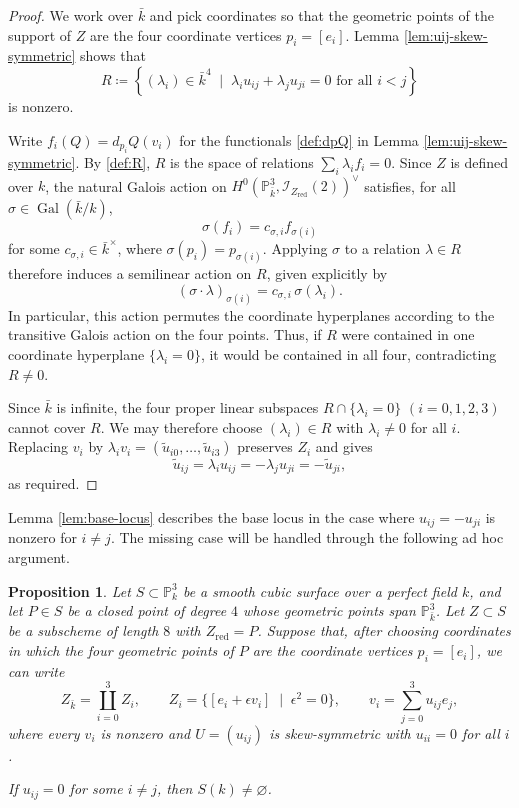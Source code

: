 \documentclass[a4paper,11pt]{amsart}
\numberwithin{equation}{section}
\newtheorem{proposition}[theorem]{Proposition}
\theoremstyle{definition}
\theoremstyle{remark}
\newcommand{\PP}{\mathbb P}
\newcommand{\CP}{\PP}
\newcommand{\Gal}{\operatorname{Gal}}
\begin{document}
\begin{proof}
We work over $\bar k$ and pick coordinates so that the geometric points 
of the support of $Z$ are the four coordinate vertices $p_i=[e_i]$.  
Lemma \ref{lem:uij-skew-symmetric} shows that
\[
R\coloneq \left\{(\lambda_i)\in\bar k^4 \; \mid\; \lambda_i u_{ij}+\lambda_j u_{ji}=0 \text{ for all }i<j\right\}
\]
is nonzero.

Write $f_i(Q)=d_{p_i}Q(v_i)$ for the functionals \eqref{def:dpQ} in Lemma \ref{lem:uij-skew-symmetric}.
By \eqref{def:R}, $R$ is the space of relations $\sum_i\lambda_i f_i=0$.
Since $Z$ is defined over $k$, the natural Galois action on $H^0(\CP^3_{\bar k},\mathcal I_{Z_{\operatorname{red}}}(2))^\vee$ 
satisfies, for all $\sigma\in \Gal(\bar k/k)$,
\[
\sigma(f_i)=c_{\sigma,i}f_{\sigma(i)}
\]
for some $c_{\sigma,i}\in{\bar k}^\times $, where
$\sigma(p_i)=p_{\sigma(i)}$.
Applying $\sigma$ to a relation $\lambda\in R$ therefore induces a semilinear
action on $R$, given explicitly by
\[
(\sigma\cdot\lambda)_{\sigma(i)}
   =c_{\sigma,i}\,\sigma(\lambda_i).
\]
In particular, this action permutes the coordinate hyperplanes
according to the transitive Galois action on the four points.  
Thus, if $R$ were contained in one coordinate hyperplane
$\{\lambda_i=0\}$, it would be contained in all four, contradicting
$R\neq0$.

Since $\bar k$ is infinite, the four proper linear subspaces
$R\cap\{\lambda_i=0\}$ $(i=0,1,2,3)$ cannot cover $R$.
We may therefore choose $(\lambda_i)\in R$ with $\lambda_i\neq0$ for all $i$.
Replacing $v_i$ by $\lambda_i v_i=(\widetilde u_{i0}, \dots, \widetilde u_{i3})$ preserves $Z_i$ and gives $ $
\[
\widetilde u_{ij}=\lambda_i u_{ij}
=-\lambda_j u_{ji}=-\widetilde u_{ji},
\]
as required.
\end{proof}

Lemma \ref{lem:base-locus} describes the base locus in the case where $u_{ij}=-u_{ji}$ is nonzero for $i\neq j$.
The missing case will be handled through the following ad hoc argument.


\begin{proposition}\label{prop:zero-off-diagonal}
Let $S\subset\CP^3_k$ be a smooth cubic surface over a perfect field $k$, and let $P\in S$ be a closed point of degree $4$ whose geometric points span $\CP^3_{\bar k}$.
Let $Z\subset S$ be a subscheme of length $8$ with $Z_{\mathrm{red}}=P$.
Suppose that, after choosing coordinates in which the four geometric
points of $P$ are the coordinate vertices $p_i=[e_i]$, we can write
\[
  Z_{\bar k}=\coprod_{i=0}^3 Z_i,  \qquad Z_i=\{[e_i+\epsilon v_i]\; \mid \; \epsilon^2=0\},  \qquad v_i=\sum_{j=0}^3u_{ij}e_j,
\]
where every $v_i$ is nonzero and $U=(u_{ij})$ is skew-symmetric with $u_{ii}=0$ for all $i$.

If $u_{ij}=0$ for some $i\ne j$, then $S(k)\ne\varnothing$.
\end{proposition}
\end{document}
